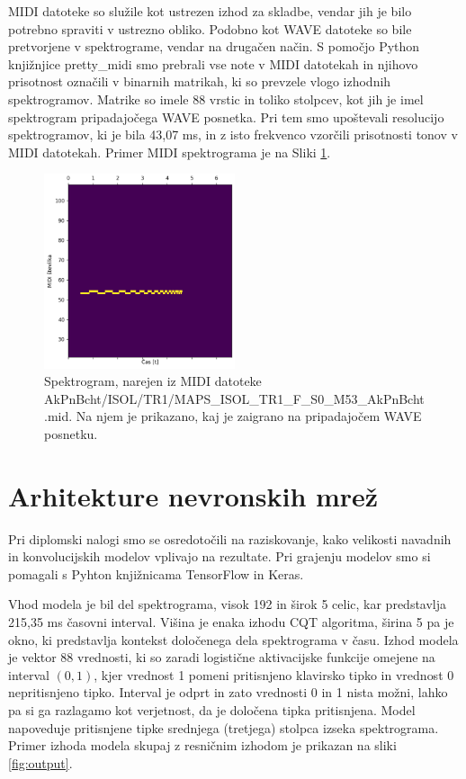 \documentclass[a4paper, 12pt, openright]{book}
\begin{document}
MIDI datoteke so služile kot ustrezen izhod za skladbe, vendar jih je bilo potrebno spraviti v ustrezno obliko.
Podobno kot WAVE datoteke so bile pretvorjene v spektrograme, vendar na drugačen način.
S pomočjo Python knjižnjice {\sf pretty\_midi} \cite{raffael2014pretty_midi} smo prebrali vse note v MIDI datotekah in njihovo prisotnost označili v binarnih matrikah, ki so prevzele vlogo izhodnih spektrogramov.
Matrike so imele 88 vrstic in toliko stolpcev, kot jih je imel spektrogram pripadajočega WAVE posnetka.
Pri tem smo upoštevali resolucijo spektrogramov, ki je bila 43,07 ms, in z isto frekvenco vzorčili prisotnosti tonov v MIDI datotekah.
Primer MIDI spektrograma je na Sliki \ref{fig:midi_spec}.

\begin{figure}
    \centering
    \includegraphics[width=0.5\textwidth]{midi_spec.png}
    \caption{Spektrogram, narejen iz MIDI datoteke \\ AkPnBcht/ISOL/TR1/MAPS\_ISOL\_TR1\_F\_S0\_M53\_AkPnBcht.mid. Na njem je prikazano, kaj je zaigrano na pripadajočem WAVE posnetku.}
    \label{fig:midi_spec}
\end{figure}

\section{Arhitekture nevronskih mrež}

Pri diplomski nalogi smo se osredotočili na raziskovanje, kako velikosti navadnih in konvolucijskih modelov vplivajo na rezultate.
Pri grajenju modelov smo si pomagali s Pyhton knjižnicama {\sf TensorFlow} \cite{tensorflow2015whitepaper} in {\sf Keras}.

Vhod modela je bil del spektrograma, visok 192 in širok 5 celic, kar predstavlja 215,35 ms časovni interval.
Višina je enaka izhodu CQT algoritma, širina 5 pa je okno, ki predstavlja kontekst določenega dela spektrograma v času.
Izhod modela je vektor 88 vrednosti, ki so zaradi logistične aktivacijske funkcije omejene na interval $ (0, 1) $, kjer vrednost 1 pomeni pritisnjeno klavirsko tipko in vrednost 0 nepritisnjeno tipko.
Interval je odprt in zato vrednosti 0 in 1 nista možni, lahko pa si ga razlagamo kot verjetnost, da je določena tipka pritisnjena.
Model napoveduje pritisnjene tipke srednjega (tretjega) stolpca izseka spektrograma. Primer izhoda modela skupaj z resničnim izhodom je prikazan na sliki \ref{fig:output}.
\end{document}
